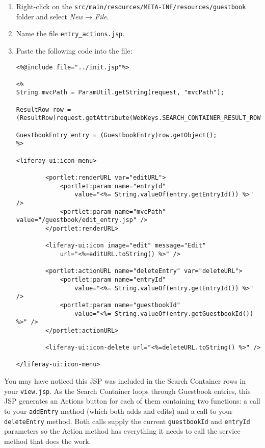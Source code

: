 \begin{enumerate}
\def\labelenumi{\arabic{enumi}.}
\item
  Right-click on the
  \texttt{src/main/resources/META-INF/resources/guestbook} folder and
  select \emph{New} → \emph{File}.
\item
  Name the file \texttt{entry\_actions.jsp}.
\item
  Paste the following code into the file:

\begin{verbatim}
<%@include file="../init.jsp"%>

<%
String mvcPath = ParamUtil.getString(request, "mvcPath");

ResultRow row = (ResultRow)request.getAttribute(WebKeys.SEARCH_CONTAINER_RESULT_ROW);

GuestbookEntry entry = (GuestbookEntry)row.getObject();
%>

<liferay-ui:icon-menu>

        <portlet:renderURL var="editURL">
            <portlet:param name="entryId"
                value="<%= String.valueOf(entry.getEntryId()) %>" />
            <portlet:param name="mvcPath" value="/guestbook/edit_entry.jsp" />
        </portlet:renderURL>

        <liferay-ui:icon image="edit" message="Edit"
            url="<%=editURL.toString() %>" />

        <portlet:actionURL name="deleteEntry" var="deleteURL">
            <portlet:param name="entryId"
                value="<%= String.valueOf(entry.getEntryId()) %>" />
            <portlet:param name="guestbookId"
                value="<%= String.valueOf(entry.getGuestbookId()) %>" />
        </portlet:actionURL>

        <liferay-ui:icon-delete url="<%=deleteURL.toString() %>" />

</liferay-ui:icon-menu>
\end{verbatim}
\end{enumerate}

You may have noticed this JSP was included in the Search Container rows
in your \texttt{view.jsp}. As the Search Container loops through
Guestbook entries, this JSP generates an Actions button for each of them
containing two functions: a call to your \texttt{addEntry} method (which
both adds and edits) and a call to your \texttt{deleteEntry} method.
Both calls supply the current \texttt{guestbookId} and \texttt{entryId}
parameters so the Action method has everything it needs to call the
service method that does the work.

